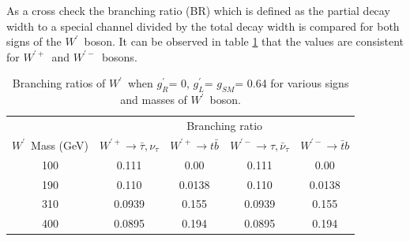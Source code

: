 \documentclass[preprint,showpacs,preprintnumbers]{revtex4}
\newcommand{\wprime}{\ensuremath{W^\prime}~}
\newcommand{\wprimep}{\ensuremath{W^{\prime+}}}
\newcommand{\wprimem}{\ensuremath{W^{\prime-}}}
\newcommand{\gR}{\ensuremath{g^\prime_R}}
\newcommand{\gL}{\ensuremath{g^\prime_L}}
\newcommand{\gSM}{\ensuremath{g_{\scriptscriptstyle SM}}}
\begin{document}
As a cross check the branching ratio (BR) which is defined as the partial decay width to a special channel divided by the total decay width is compared for both signs of the \wprime boson. 
It can be observed in table \ref{tab:W'BR} that the values are consistent for \wprimep ~and \wprimem ~bosons. 
\begin{table}[htb]
	\centering
	\caption{Branching ratios of \wprime  when \gR = 0, \gL = \gSM = 0.64 for various signs and masses of \wprime boson. \label{tab:W'BR} }
	\begin{tabular}{|c|c|c|c|c|}
		\hline 
		& \multicolumn{4}{c|}{Branching ratio}\\\cline{2-5}
		\wprime Mass (GeV) &   \wprimep $\rightarrow \bar{\tau},\nu_\tau $&   \wprimep$\rightarrow  t \bar{b}$ &   \wprimem$\rightarrow \tau,\bar{\nu}_\tau $ &  \wprimem$\rightarrow  \bar{t}b $ \\
		\hline 
		100  & 0.111  & 0.00   & 0.111  & 0.00\\
		190  & 0.110  & 0.0138 & 0.110  & 0.0138\\
		310  & 0.0939 & 0.155  & 0.0939 & 0.155\\
		400  & 0.0895 & 0.194  & 0.0895 & 0.194\\
		\hline
	\end{tabular}
\end{table}
\end{document}
